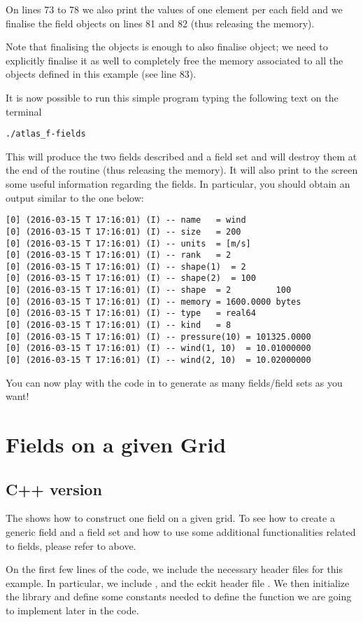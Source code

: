 On lines 73 to 78 we also print the values of one element 
per each field and we finalise the field objects on lines 
81 and 82 (thus releasing the memory).

Note that finalising the  objects 
is enough to also finalise  object;
we need to explicitly finalise it as well to completely 
free the memory associated to all the objects defined 
in this example (see line 83).

It is now possible to run this simple program typing
the following text on the terminal
%
\begin{lstlisting}[style=BashStyle]
./atlas_f-fields
\end{lstlisting}
% 
This will produce the two fields described and a field 
set and will destroy them at the end of the routine 
(thus releasing the memory). It will also print to 
the screen some useful information regarding the fields.
In particular, you should obtain an output similar to 
the one below:
%
\begin{lstlisting}[style=BashStyle]
[0] (2016-03-15 T 17:16:01) (I) -- name   = wind
[0] (2016-03-15 T 17:16:01) (I) -- size   = 200
[0] (2016-03-15 T 17:16:01) (I) -- units  = [m/s]
[0] (2016-03-15 T 17:16:01) (I) -- rank   = 2
[0] (2016-03-15 T 17:16:01) (I) -- shape(1)  = 2
[0] (2016-03-15 T 17:16:01) (I) -- shape(2)  = 100
[0] (2016-03-15 T 17:16:01) (I) -- shape  = 2         100
[0] (2016-03-15 T 17:16:01) (I) -- memory = 1600.0000 bytes
[0] (2016-03-15 T 17:16:01) (I) -- type   = real64
[0] (2016-03-15 T 17:16:01) (I) -- kind   = 8
[0] (2016-03-15 T 17:16:01) (I) -- pressure(10) = 101325.0000
[0] (2016-03-15 T 17:16:01) (I) -- wind(1, 10)  = 10.01000000
[0] (2016-03-15 T 17:16:01) (I) -- wind(2, 10)  = 10.02000000
\end{lstlisting}
% 
You can now play with the code in  
to generate as many fields/field sets as you want! 




\section{Fields on a given Grid}
\label{sect:grid-fields}

\subsection{C++ version}
The  shows how to construct one field
on a given grid. To see how to create a generic field and 
a field set and how to use some additional functionalities 
related to fields, please refer to 
above. 
%

%
On the first few lines of the code, we include the necessary 
header files for this example. In particular, we include 
,  and the eckit header file 
. We then initialize the \Atlas library 
and define some constants needed to define the function 
we are going to implement later in the code. 

